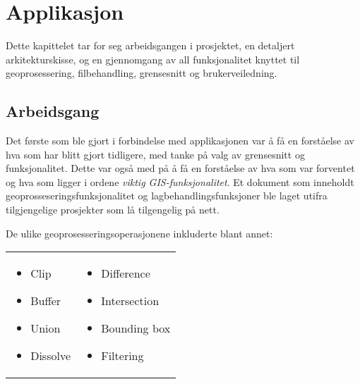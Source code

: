 \chapter{Applikasjon}

Dette kapittelet tar for seg arbeidsgangen i prosjektet, en detaljert arkitekturskisse, og en gjennomgang av all funksjonalitet knyttet til geoprosessering, filbehandling, grensesnitt og brukerveiledning.

\section{Arbeidsgang}

Det første som ble gjort i forbindelse med applikasjonen var å få en forståelse av hva som har blitt gjort tidligere, med tanke på valg av grensesnitt og funksjonalitet. Dette var også med på å få en forståelse av hva som var forventet og hva som ligger i ordene \textit{viktig GIS-funksjonalitet}. Et dokument som inneholdt geoprosseseringsfunksjonalitet og lagbehandlingsfunksjoner ble laget utifra tilgjengelige prosjekter\cite{Johanessen}\cite{Strand}\cite{Eglaaen}\cite{Villanger}\cite{Jakobsen} som lå tilgengelig på nett.

De ulike geoprosesseringsoperasjonene inkluderte blant annet:

\begin{frame}

    \begin{tabular}{p{}p{}}

        \begin{itemize}
            \item Clip
            \item Buffer
            \item Union
            \item Dissolve
        \end{itemize} &

        \begin{itemize}
            \item Difference
            \item Intersection
            \item Bounding box
            \item Filtering
        \end{itemize}
    \end{tabular}

\end{frame}

